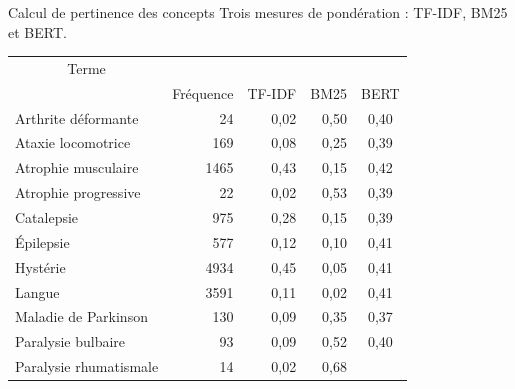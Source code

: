 \begin{frame}{Calcul de pertinence des concepts}
Trois mesures de pondération : \textsc{TF-IDF}, \textsc{BM25} et \textsc{BERT}.
    \footnotesize
\begin{table}[]
\begin{tabular}{|l|cccc|}
\hline
\multicolumn{1}{|c|}{\multirow{}{}{Terme}} & \multicolumn{4}{c|}{\cellcolor{gray!10!white}{ Corpus \og{}Autres\fg{}}}                              \\ \cline{2-5} 
\multicolumn{1}{|c|}{}                       & \multicolumn{1}{c}{{Fréquence}} & \multicolumn{1}{c}{{TF-IDF}} & \multicolumn{1}{c}{{BM25}}  & {BERT} \\ \hline
{Arthrite déformante} &
  \multicolumn{1}{|r|}{{24}} &
  \multicolumn{1}{|r|}{{0,02}} &
  \multicolumn{1}{|r|}{{0,50}} &
  {0,40} \\ \hline
{Ataxie locomotrice} &
  \multicolumn{1}{|r|}{{169}} &
  \multicolumn{1}{|r|}{{0,08}} &
  \multicolumn{1}{|r|}{{0,25}} &
  {0,39} \\ \hline
{Atrophie musculaire} &
  \multicolumn{1}{|r|}{{1465}} &
  \multicolumn{1}{|r|}{{0,43}} &
  \multicolumn{1}{|r|}{{0,15}} &
  {0,42} \\ \hline
{Atrophie progressive} &
  \multicolumn{1}{|r|}{{22}} &
  \multicolumn{1}{|r|}{{0,02}} &
  \multicolumn{1}{|r|}{{0,53}} &
  {0,39} \\ \hline
{Catalepsie} &
  \multicolumn{1}{|r|}{{975}} &
  \multicolumn{1}{|r|}{{0,28}} &
  \multicolumn{1}{|r|}{{0,15}} &
  {0,39} \\ \hline
{Épilepsie} &
  \multicolumn{1}{|r|}{{577}} &
  \multicolumn{1}{|r|}{{0,12}} &
  \multicolumn{1}{|r|}{{0,10}} &
  {0,41} \\ \hline
{Hystérie} &
  \multicolumn{1}{|r|}{{4934}} &
  \multicolumn{1}{|r|}{{0,45}} &
  \multicolumn{1}{|r|}{{0,05}} &
  {0,41} \\ \hline
{Langue} &
  \multicolumn{1}{|r|}{{3591}} &
  \multicolumn{1}{|r|}{{0,11}} &
  \multicolumn{1}{|r|}{{0,02}} &
  {0,41} \\ \hline
{Maladie de Parkinson} &
  \multicolumn{1}{|r|}{{130}} &
  \multicolumn{1}{|r|}{{0,09}} &
  \multicolumn{1}{|r|}{{0,35}} &
  {0,37} \\ \hline
{Paralysie bulbaire} &
  \multicolumn{1}{|r|}{{93}} &
  \multicolumn{1}{|r|}{{0,09}} &
  \multicolumn{1}{|r|}{{0,52}} &
  {0,40} \\ \hline
{Paralysie rhumatismale} &
  \multicolumn{1}{|r|}{{14}} &
  \multicolumn{1}{|r|}{{0,02}} &
  \multicolumn{1}{|r|}{{0,68}} &

\end{tabular}
\end{table}
\end{frame}
